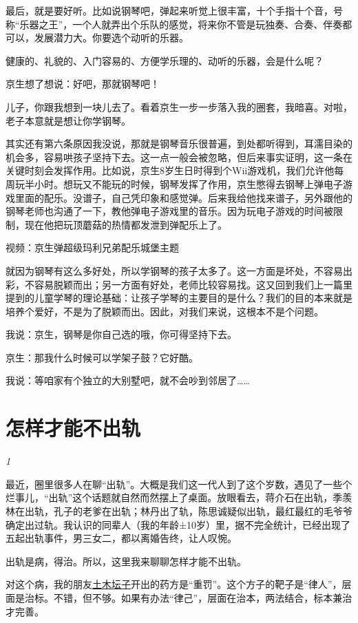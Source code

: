 \documentclass[twoside,openright,headings=optiontohead]{ctexbook} %
\begin{document}
{最后，就是要好听。比如说钢琴吧，弹起来听觉上很丰富，十个手指十个音，号称``乐器之王''，一个人就弄出个乐队的感觉，将来你不管是玩独奏、合奏、伴奏都可以，发展潜力大。你要选个动听的乐器。

健康的、礼貌的、入门容易的、方便学乐理的、动听的乐器，会是什么呢？

京生想了想说：好吧，那就钢琴吧！

儿子，你跟我想到一块儿去了。看着京生一步一步落入我的圈套，我暗喜。对啦，老子本意就是想让你学钢琴。

其实还有第六条原因我没说，那就是钢琴音乐很普遍，到处都听得到，耳濡目染的机会多，容易哄孩子坚持下去。这一点一般会被忽略，但后来事实证明，这一条在关键时刻会发挥作用。比如说，京生8岁生日时得到个Wii游戏机，我们允许他每周玩半小时。想玩又不能玩的时候，钢琴发挥了作用，京生憋得去钢琴上弹电子游戏里面的配乐。没谱子，自己凭印象和感觉弹。后来我给他找来谱子，另外跟他的钢琴老师也沟通了一下，教他弹电子游戏里的音乐。因为玩电子游戏的时间被限制，现在他把玩顶蘑菇的热情都发泄到弹配乐上了。

视频：京生弹超级玛利兄弟配乐城堡主题

就因为钢琴有这么多好处，所以学钢琴的孩子太多了。这一方面是坏处，不容易出彩，不容易脱颖而出；另一方面有好处，老师比较容易找。这又回到我们上一篇里提到的儿童学琴的理论基础：让孩子学琴的主要目的是什么？我们的目的本来就是培养个爱好，不是为了脱颖而出。因此，对我们来说，这根本不是个问题。

我说：京生，钢琴是你自己选的哦，你可得坚持下去。

京生：那我什么时候可以学架子鼓？它好酷。

我说：等咱家有个独立的大别墅吧，就不会吵到邻居了\ldots{}\ldots{}

\chapter*{怎样才能不出轨}\label{selfish-gene}

\emph{1}

最近，圈里很多人在聊``出轨''。大概是我们这一代人到了这个岁数，遇见了一些个烂事儿，``出轨''这个话题就自然而然摆上了桌面。放眼看去，蒋介石在出轨，季羡林在出轨，孔子的老爹在出轨；林丹出了轨，陈思诚疑似出轨，最红最红的毛爷爷确定出过轨。我认识的同辈人（我的年龄±10岁）里，据不完全统计，已经出现了五起出轨事件，男三女二，都以离婚告终，让人叹惋。

出轨是病，得治。所以，这里我来聊聊怎样才能不出轨。

对这个病，我的朋友\href{https://tumutanzi.com/archives/15542}{土木坛子}开出的药方是``重罚''。这个方子的靶子是``律人''，层面是治标。不错，但不够。如果有办法``律己''，层面在治本，两法结合，标本兼治才完善。

}
\end{document}
